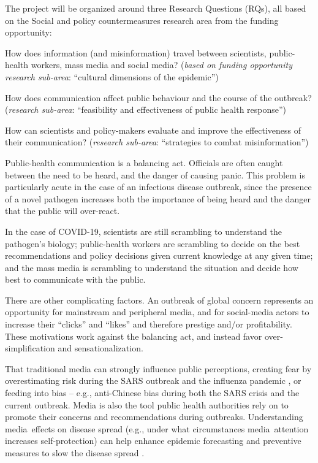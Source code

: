 The project will be organized around three Research Questions (RQs), all based on the Social and policy countermeasures research area from the funding opportunity:

 How does information (and misinformation) travel between scientists, public-health workers, mass media and social media? (\emph{based on funding opportunity research sub-area}: ``cultural dimensions of the epidemic'')

 How does communication affect public behaviour and the course of the outbreak? (\emph{research sub-area}: ``feasibility and effectiveness of public health response'') 

 How can scientists and policy-makers evaluate and improve the effectiveness of their communication? (\emph{research sub-area}: ``strategies to combat misinformation'')


Public-health communication is a balancing act. Officials are often caught between the need to be heard, and the danger of causing panic. This problem is particularly acute in the case of an infectious disease outbreak, since the presence of a novel pathogen increases both the importance of being heard and the danger that the public will over-react. 

In the case of COVID-19, scientists are still scrambling to understand the pathogen's biology; public-health workers are scrambling to decide on the best recommendations and policy decisions given current knowledge at any given time; and the mass media is scrambling to understand the situation and decide how best to communicate with the public. 

There are other complicating factors. An outbreak of global concern represents an opportunity for mainstream and peripheral media, and for social-media actors to increase their ``clicks'' and ``likes'' and therefore prestige and/or profitability. These motivations work against the balancing act, and instead favor over-simplification and sensationalization.

That traditional media can strongly influence public perceptions, creating fear by overestimating risk during the SARS outbreak \citep{BerrWhar07} and the influenza pandemic \citep{TchuDube11}, or feeding into bias -- e.g., anti-Chinese bias during both the SARS crisis \citep{HuanLeun05} and the current outbreak.
Media is also the tool public health authorities rely on to promote their concerns and recommendations during outbreaks.  Understanding media effects on disease spread (e.g., under what circumstances media attention increases self-protection) can help enhance epidemic forecasting and preventive measures to slow the disease spread \citep{KimFast19}.  

